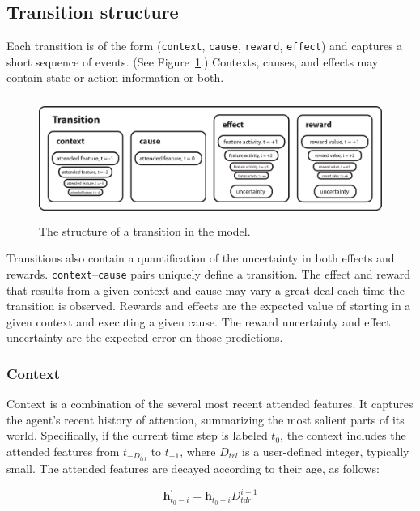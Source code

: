 \subsection{Transition structure}

Each transition is of the form (\texttt{context}, \texttt{cause}, \texttt{reward}, \texttt{effect}) and captures a short sequence of events. (See Figure~\ref{transition_structure}.) Contexts, causes, and effects may contain state or action information or both.

\begin{figure}
\centering
\includegraphics[height=4cm]{figs/transition.eps}
\caption{The structure of a transition in the model.}
\label{transition_structure}
\end{figure}

Transitions also contain a quantification of the uncertainty in both effects and rewards. \texttt{context}--\texttt{cause} pairs uniquely define a transition. The effect and reward that results from a given context and cause may vary a great deal each time the transition is observed. Rewards and effects are the expected value of starting in a given context and executing a given cause. The reward uncertainty and effect uncertainty are the expected error on those predictions.

 
\subsubsection{Context}
Context is a combination of the several most recent attended features. It captures the agent's recent history of attention, summarizing the most salient parts of its world.
Specifically, if the current time step is labeled $t_{0}$, the context includes the attended features from $t_{-D_{trl}}$ to $t_{-1}$, where $D_{trl}$ is a user-defined integer, typically small. The attended features are decayed according to their age, as follows:

\begin{equation}
\mathbf{h}^\prime_{t_0-i} =  \mathbf{h}_{t_0-i} D_{tdr}^{i-1} 
\end{equation}


